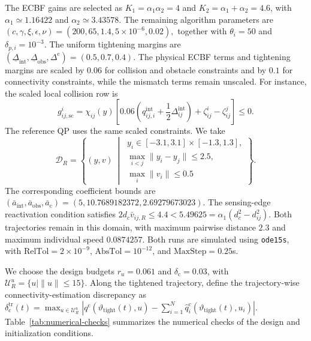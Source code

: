 The ECBF gains are selected as
$
K_1=\alpha_1\alpha_2=4$ and $
K_2=\alpha_1+\alpha_2=4.6$,
with $\alpha_1\simeq1.16422$ and
$\alpha_2\simeq3.43578$.
The remaining algorithm parameters are
$
(c,\gamma,\xi,\epsilon,\nu)
=
(200,65,1.4,5\times10^{-6},0.02),
$
together with $\theta_i=50$ and $\delta_{p,i}=10^{-3}$.
The uniform tightening margins are
$
(\underline{\Delta}_{\mathrm{int}},
\underline{\Delta}_{\mathrm{obs}},
\Delta^{\mathrm c})
=
(0.5,0.7,0.4).
$
The physical ECBF terms and tightening margins
are scaled by $0.06$ for collision and obstacle
constraints and by $0.1$ for connectivity constraints,
while the mismatch terms remain unscaled.
For instance, the scaled local collision row is
$$
g_{ij,\mathrm{sc}}^i
=\chi_{ij}(y)\left[
0.06\left(q_{ij,i}^{\mathrm{int}}
+\frac12\Delta_{ij}^{\mathrm{int}}\right)
+\zeta_{ij}^i-\zeta_{ij}^j
\right]\leqslant0.
$$
The reference QP uses the same scaled constraints.
We take
$$
\mathcal D_R=
\left\{
(y,v)\ \middle|\
\begin{array}{l}
	y_i\in[-3.1,3.1]\times[-1.3,1.3],\\
	\max_{i<j}\|y_i-y_j\|\leqslant2.5,\\
	\max_i\|v_i\|\leqslant0.5
\end{array}
\right\}.
$$
The corresponding coefficient bounds are
$
(\bar a_{\mathrm{int}},
\bar a_{\mathrm{obs}},
\bar a_{\mathrm c})
=
(5,10.7689182372,2.69279673023).
$
The sensing-edge reactivation condition satisfies
$
2d_c\bar v_{ij,R}
\leqslant4.4
<
5.49625
=
\alpha_1(d_c^2-d_{ij}^2).
$
Both trajectories remain in this domain, with maximum
pairwise distance $2.3$ and maximum individual speed
$0.0874257$. Both runs are simulated 
using \texttt{ode15s}, with
$\mathrm{RelTol}=2\times10^{-9}$,
$\mathrm{AbsTol}=10^{-12}$, and
$\mathrm{MaxStep}=0.25$s.

We choose the design budgets
$r_u=0.061$ and $\delta_{\mathrm c}=0.03$, with
$
\mathcal U_R^u=\{u\mid\|u\|\leqslant15\}.
$
Along the tightened trajectory, define the trajectory-wise connectivity-estimation discrepancy as
$
\delta_{\mathrm c}^{\mathrm{tr}}(t)
=
\max_{u\in\mathcal U_R^u}
|
q^{\mathrm c}(\vartheta_{\mathrm{tight}}(t),u)
-
\sum_{i=1}^N
\hat q_i^{\mathrm c}(\vartheta_{\mathrm{tight}}(t),u_i)
|.
$
Table~\ref{tab:numerical-checks} summarizes
the numerical checks of the design and
initialization conditions.

